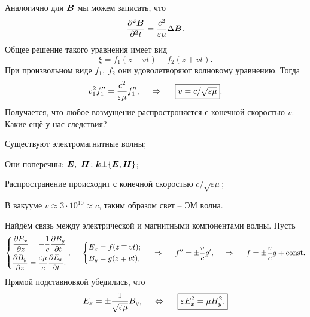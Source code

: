 Аналогично для $\mbox{\boldmath $B$}$ мы можем записать, что
\begin{equation*}
    \frac{\partial^2 \mbox{\boldmath $B$}}{\partial^2 t}  = \frac{c^2}{\varepsilon \mu}  \Delta \mbox{\boldmath $B$}.
\end{equation*}
Общее решение такого уравнения имеет вид
\begin{equation*}
    \xi = f_1(z-vt) + f_2 (z+vt).
\end{equation*}
При произвольном виде $f_1, \ f_2$ они удоволетворяют волновому уравнению. Тогда
\begin{equation*}
    v_1^2 f_1'' = \frac{c^2}{\varepsilon \mu} f_1'',
    \hspace{0.5cm} \Rightarrow \hspace{0.5cm} 
    \boxed{
        v = c / \sqrt{\varepsilon \mu}   
    }.
\end{equation*}
Получается, что любое возмущение распростроняется с конечной скоростью $v$. Какие ещё у нас следствия?
\begin{enumerate*}
    \item Существуют электромагнитные волны;
    \item Они поперечны: $\mbox{\boldmath $E$}, \ \mbox{\boldmath $H$} \colon \mbox{\boldmath $k$} \bot \{\mbox{\boldmath $E$}, \mbox{\boldmath $H$}\}$;
    \item Распространение происходит с конечной скоростью $c / \sqrt{\varepsilon \mu}$;
    \item В вакууме $v  \approx 3 \cdot 10^{10} \approx c$, таким образом свет -- ЭМ волна.
\end{enumerate*}

Найдём связь между электрической и магнитными компонентами волны. Пусть
\begin{equation*}
    \left\{\begin{aligned}
        \frac{\partial E_x}{\partial z} = - \frac{1}{c} \frac{\partial B_y}{\partial t} \\
        \frac{\partial B_y}{\partial z} = \frac{\varepsilon \mu}{c} \frac{\partial E_x}{\partial t}.
    \end{aligned}\right.,
    \hspace{0.5cm} 
    \left\{\begin{aligned}
        E_x &= f(z \mp v t); \\
        B_y &= g(z \mp vt),
    \end{aligned}\right. 
    \hspace{0.5cm} \Rightarrow \hspace{0.5cm} 
    f'' = \pm \frac{v}{c} g',
    \hspace{0.5cm} \Rightarrow \hspace{0.5cm} 
    f = \pm \frac{v}{c} g + \text{const}.
\end{equation*}
Прямой подставновкой убедились, что
\begin{equation*}
    E_x = \pm \frac{1}{\sqrt{\varepsilon\mu}} B_y, \hspace{0.5cm} \Leftrightarrow 
    \hspace{0.5cm} 
    \boxed{
        \varepsilon E_x^2 = \mu H_y^2.   
    }
\end{equation*}

